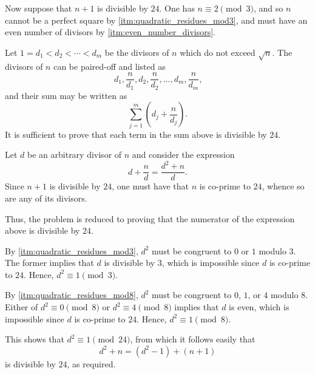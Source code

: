 \documentclass[a4paper,reqno,12pt]{amsart}
\begin{document}
\begin{soln}
    Now suppose that \(n + 1\) is divisible by \(24\). One has \(n \equiv 2 \pmod 3\), and so \(n\) cannot be a perfect square by \ref{itm:quadratic_residues_mod3}, and must have an even number of divisors by \ref{itm:even_number_divisors}.
    
    Let \(1 = d_1 < d_2 < \dotsb < d_m\) be the divisors of \(n\) which do not exceed \(\sqrt{n}\). The divisors of \(n\) can be paired-off and listed as
    \[
    d_1, \frac{n}{d_1}, d_2, \frac{n}{d_2},\dotsc, d_m, \frac{n}{d_m}\text{,}  
    \]
    and their sum may be written as
    \[
    \sum_{j = 1}^m \left(d_j + \frac{n}{d_j}\right)\text{.}
    \]
    It is sufficient to prove that each term in the sum above is divisible by \(24\).
    
    Let \(d\) be an arbitrary divisor of \(n\) and consider the expression
    \[
    d + \frac{n}{d} = \frac{d^2 + n}{d}\text{.}
    \]
    Since \(n + 1\) is divisible by \(24\), one must have that \(n\) is co-prime to \(24\), whence so are any of its divisors.
    
    Thus, the problem is reduced to proving that the numerator of the expression above is divisible by \(24\).
    
    By \ref{itm:quadratic_residues_mod3},  \(d^2\) must be congruent to \(0\) or \(1\) modulo \(3\). The former implies that \(d\) is divisible by \(3\), which is impossible since \(d\) is co-prime to \(24\). Hence, \(d^2 \equiv 1 \pmod{3}\).
    
    By \ref{itm:quadratic_residues_mod8}, \(d^2\) must be congruent to \(0\), \(1\), or \(4\) modulo \(8\). Either of \(d^2 \equiv 0 \pmod{8}\) or \(d^2 \equiv 4 \pmod{8}\) implies that \(d\) is even, which is impossible since \(d\) is co-prime to \(24\). Hence, \(d^2 \equiv 1 \pmod{8}\).
    
    This shows that \(d^2 \equiv 1 \pmod{24}\), from which it follows easily that
    \[
    d^2 + n = (d^2 - 1) + (n + 1)
    \]
    is divisible by \(24\), as required.
\end{soln}
\end{document}
